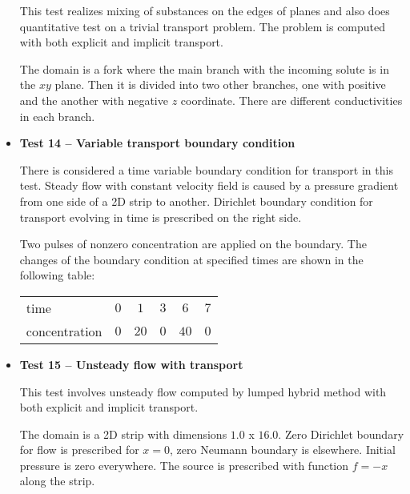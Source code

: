 \documentclass[12pt,a4paper]{report}
\begin{document}
\begin{itemize}
This test realizes mixing of substances on the edges of planes and also does quantitative test on a trivial transport problem. The problem is computed with both explicit and implicit transport.

The domain is a fork where the main branch with the incoming solute is in the $xy$ plane. Then it is divided into two other branches, one with positive and the another with negative $z$ coordinate. There are different conductivities in each branch.



\item \textbf{Test 14 -- Variable transport boundary condition}

There is considered a time variable boundary condition for transport in this test. Steady flow with constant velocity field is caused by a pressure gradient from one side of a 2D strip to another. Dirichlet boundary condition for transport evolving in time is prescribed on the right side. 

Two pulses of nonzero concentration are applied on the boundary. The changes of the boundary condition at specified times are shown in the following table:

\begin{center}
  \begin{tabular}{|l|c|c|c|c|c|}
    \hline
    time & $0$ & $1$ & $3$ & $6$ & $7$\\
    concentration & $0$ & $20$ & $0$ & $40$ & $0$\\
    \hline
  \end{tabular}
\end{center}



\item \textbf{Test 15 -- Unsteady flow with transport}

This test involves unsteady flow computed by lumped hybrid method with both explicit and implicit transport.
 
The domain is a 2D strip with dimensions $1.0$ x $16.0$. Zero Dirichlet boundary for flow is prescribed for $x=0$, zero Neumann boundary is elsewhere. Initial pressure is zero everywhere. The source is prescribed with function $f=-x$ along the strip.


\end{itemize}
\end{document}
